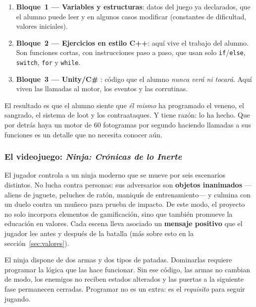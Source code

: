 \documentclass[a4paper,12pt]{article}
\newcounter{subsubsubsection}[subsubsection]
\begin{document}
\begin{enumerate}
  \item \textbf{Bloque~1 — Variables y estructuras}: datos del juego ya declarados, que el
        alumno puede leer y en algunos casos modificar (constantes de dificultad, valores iniciales).
  \item \textbf{Bloque~2 — Ejercicios en estilo C++}: aquí vive el trabajo del alumno. Son
        funciones cortas, con instrucciones paso a paso, que usan solo \texttt{if}/\texttt{else},
        \texttt{switch}, \texttt{for} y \texttt{while}.
  \item \textbf{Bloque~3 —  Unity/C\#} \cite{csharpUnity} \cite{csharpUnity}: código que el alumno \emph{nunca verá ni
        tocará}. Aquí viven las llamadas al motor, los eventos y las corrutinas.
\end{enumerate}

El resultado es que el alumno siente que \emph{él mismo} ha programado el veneno, el sangrado, el
sistema de loot y los contraataques. Y tiene razón: lo ha hecho. Que por detrás haya un motor de
60 fotogramas por segundo haciendo llamadas a sus funciones es un detalle que no necesita conocer
aún.

\subsubsection{El videojuego: \textit{Ninja: Crónicas de lo Inerte}}


El jugador controla a un ninja moderno que se mueve por seis escenarios distintos. No lucha contra
personas: sus adversarios son \textbf{objetos inanimados} —aliens de juguete, peluches de ratón,
maniquís de entrenamiento— y culmina con un duelo contra un muñeco para prueba de impacto. De este modo,
el proyecto no solo incorpora elementos de gamificación, sino que también promueve la educación en valores.
Cada escena lleva asociado un \textbf{mensaje positivo} que el jugador lee antes y después de la batalla
(más sobre esto en la sección~\ref{sec:valores}).

El ninja dispone de dos armas y dos tipos de patadas. Dominarlas requiere programar la lógica que
las hace funcionar. Sin ese código, las armas no cambian de modo, los enemigos no reciben estados
alterados y las puertas a la siguiente fase permanecen cerradas. Programar no es un extra: es el
\emph{requisito} para seguir jugando.
\end{document}
